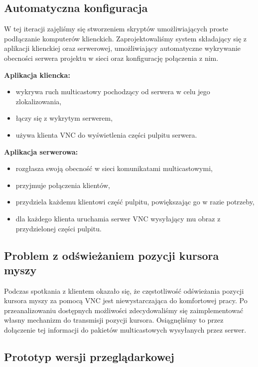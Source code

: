   \subsection{Automatyczna konfiguracja}

    W tej iteracji zajęliśmy się stworzeniem skryptów umożliwiających proste podłączanie komputerów klienckich. Zaprojektowaliśmy system składający się z aplikacji klienckiej oraz serwerowej, umożliwiający automatyczne wykrywanie obecności serwera projektu w sieci oraz konfigurację połączenia z nim.

    \textbf{Aplikacja kliencka:}
    \begin{itemize}[noitemsep,nolistsep]
      \item wykrywa ruch multicastowy pochodzący od serwera w celu jego zlokalizowania,
      \item łączy się z wykrytym serwerem,
      \item używa klienta VNC do wyświetlenia części pulpitu serwera.
    \end{itemize}

    \textbf{Aplikacja serwerowa:}
    \begin{itemize}[noitemsep,nolistsep]
      \item rozgłasza swoją obecność w sieci komunikatami multicastowymi,
      \item przyjmuje połączenia klientów,
      \item przydziela każdemu klientowi część pulpitu, powiększając go w razie potrzeby,
      \item dla każdego klienta uruchamia serwer VNC wysyłający mu obraz z przydzielonej części pulpitu.
    \end{itemize}

  \subsection{Problem z odświeżaniem pozycji kursora myszy}

    Podczas spotkania z klientem okazało się, że częstotliwość odświeżania pozycji kursora myszy za pomocą VNC jest niewystarczająca do komfortowej pracy. Po przeanalizowaniu dostępnych możliwości zdecydowaliśmy się zaimplementować własny mechanizm do transmisji pozycji kursora. Osiągnęliśmy to przez dołączenie tej informacji do pakietów multicastowych wysyłanych przez serwer.

  \subsection{Prototyp wersji przeglądarkowej}

